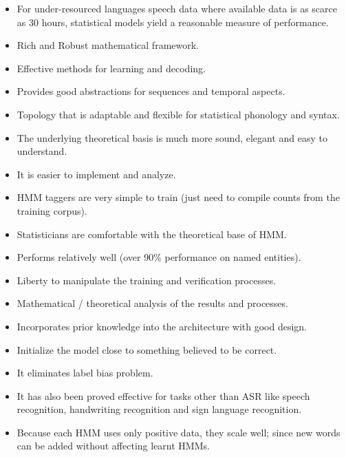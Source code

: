 \begin{itemize}
    \item For under-resourced languages speech data where available data is as scarce as 30 hours, statistical models yield a reasonable measure of performance\cite{naeem_subspace_2020}.
    \item Rich and Robust mathematical framework\cite{morgan_continuous_1995}.
    \item Effective methods for learning and decoding.
    \item Provides good abstractions for sequences and temporal aspects.
    \item Topology that is adaptable and flexible for statistical phonology and syntax.
    \item The underlying theoretical basis is much more sound, elegant and easy to understand.
    \item It is easier to implement and analyze.
    \item HMM taggers are very simple to train (just need to compile counts from the training corpus).
    \item Statisticians are comfortable with the theoretical base of HMM.
    \item Performs relatively well (over 90\% performance on named entities).
    \item Liberty to manipulate the training and verification processes.
    \item Mathematical / theoretical analysis of the results and processes.
    \item Incorporates prior knowledge into the architecture with good design.
    \item Initialize the model close to something believed to be correct.
    \item It eliminates label bias problem.
    \item It has also been proved effective for tasks other than ASR like speech recognition, handwriting recognition and sign language recognition.
    \item Because each HMM uses only positive data, they scale well; since new words can be added without affecting learnt HMMs.
\end{itemize}


